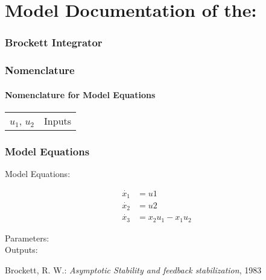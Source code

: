 \documentclass[10pt,a4paper]{article}
\begin{document}
	\part*{Model Documentation of the:}
	\section*{Brockett Integrator} %
	
	
	\section{Nomenclature} %
	\subsection{Nomenclature for Model Equations} %
	
	\begin{tabular}{ll}
		$u_1$, $u_2$ & Inputs		
	\end{tabular}

	
	\section{Model Equations} %
	
	\noindent Model Equations:
	
	\begin{subequations}
	\begin{align}
		\dot{x_1} &= u1 \\      %
		\dot{x_2} &= u2 \\
		\dot{x_3} &= x_2 u_1 - x_1 u_2
	\end{align}
	\end{subequations}

	
	\noindent
	Parameters:  
	\\
	Outputs:
	
	
	\begin{thebibliography}{10}		
		Brockett, R. W.: 
		\textit{Asymptotic Stability and feedback stabilization}, 1983
	\end{thebibliography}
\end{document}
